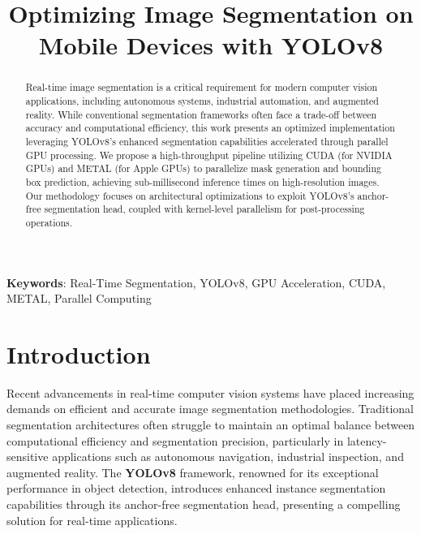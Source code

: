 \documentclass[conference]{IEEEtran}
\begin{document}
\title{Optimizing Image Segmentation on Mobile Devices with YOLOv8
}

\author{
\and
{}
}

\maketitle

\begin{abstract}

Real-time image segmentation is a critical requirement for modern computer vision applications, including autonomous systems, industrial automation, and augmented reality. While conventional segmentation frameworks often face a trade-off between accuracy and computational efficiency, this work presents an optimized implementation leveraging {YOLOv8's} enhanced segmentation capabilities accelerated through parallel GPU processing. We propose a high-throughput pipeline utilizing {CUDA (for NVIDIA GPUs) and METAL (for Apple GPUs)} to parallelize mask generation and bounding box prediction, achieving sub-millisecond inference times on high-resolution images. Our methodology focuses on architectural optimizations to exploit YOLOv8’s anchor-free segmentation head, coupled with kernel-level parallelism for post-processing operations. 
\end{abstract}

\noindent \textbf{Keywords}: Real-Time Segmentation, YOLOv8, GPU Acceleration, CUDA, METAL, Parallel Computing
\section{Introduction}

Recent advancements in real-time computer vision systems have placed increasing demands on efficient and accurate image segmentation methodologies. Traditional segmentation architectures often struggle to maintain an optimal balance between computational efficiency and segmentation precision, particularly in latency-sensitive applications such as autonomous navigation, industrial inspection, and augmented reality. The \textbf{YOLOv8} framework, renowned for its exceptional performance in object detection, introduces enhanced instance segmentation capabilities through its anchor-free segmentation head, presenting a compelling solution for real-time applications.
\end{document}
